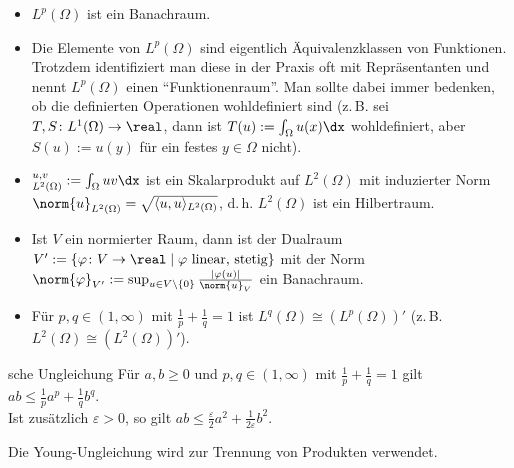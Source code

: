 \begin{Bem}
    \begin{itemize}
        \item
        $L^p(\Omega)$ ist ein Banachraum.

        \item
        Die Elemente von $L^p(\Omega)$ sind eigentlich Äquivalenzklassen von Funktionen.
        Trotzdem identifiziert man diese in der Praxis oft mit Repräsentanten und nennt
        $L^p(\Omega)$ einen "`Funktionenraum"'.
        Man sollte dabei immer bedenken, ob die definierten Operationen wohldefiniert sind
        (z.\,B. sei $T, S\colon L^1(\Omega) \to \real$,
        dann ist $T(u) := \int_\Omega u(x) \dx$ wohldefiniert,
        aber $S(u) := u(y)$ für ein festes $y \in \Omega$ nicht).

        \item
        $\sp{u, v}_{L^2(\Omega)} := \int_\Omega uv \dx$ ist ein Skalarprodukt auf
        $L^2(\Omega)$ mit induzierter Norm\\
        $\norm{u}_{L^2(\Omega)} = \sqrt{\langle u, u \rangle_{L^2(\Omega)}}$,
        d.\,h. $L^2(\Omega)$ ist ein Hilbertraum.

        \item
        Ist $V$ ein normierter Raum, dann ist der Dualraum
        $V' := \{\varphi\colon V \to \real \;|\; \text{$\varphi$ linear, stetig}\}$
        mit der Norm
        $\norm{\varphi}_{V'} := \sup_{u \in V \setminus \{0\}} \frac{|\varphi(u)|}{\norm{u}_V}$
        ein Banachraum.

        \item
        Für $p, q \in (1, \infty)$ mit $\frac{1}{p} + \frac{1}{q} = 1$ ist
        $L^q(\Omega) \cong (L^p(\Omega))'$
        (z.\,B. $L^2(\Omega) \cong (L^2(\Omega))'$).
    \end{itemize}
\end{Bem}

\linie

\begin{Satz}{sche Ungleichung}
    Für $a, b \ge 0$ und $p, q \in (1, \infty)$ mit $\frac{1}{p} + \frac{1}{q} = 1$ gilt
    $ab \le \frac{1}{p} a^p + \frac{1}{q} b^q$.\\
    Ist zusätzlich $\varepsilon > 0$, so gilt
    $ab \le \frac{\varepsilon}{2} a^2 + \frac{1}{2\varepsilon} b^2$.
\end{Satz}

\begin{Bem}
    Die Young-Ungleichung wird zur Trennung von Produkten verwendet.
\end{Bem}

